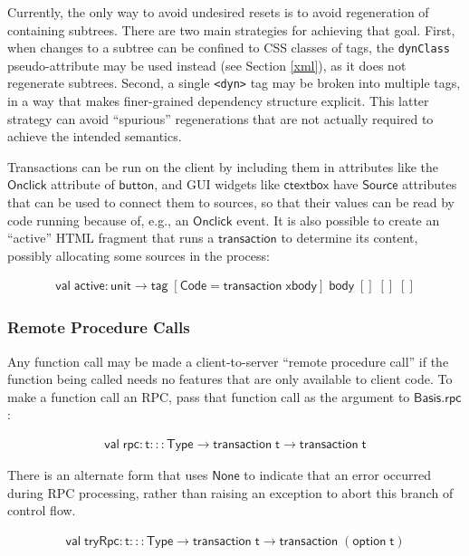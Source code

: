 \documentclass{article}
\newcommand{\cd}[1]{\texttt{#1}}
\newcommand{\mt}[1]{\mathsf{#1}}
\begin{document}
Currently, the only way to avoid undesired resets is to avoid regeneration of containing subtrees.  There are two main strategies for achieving that goal.  First, when changes to a subtree can be confined to CSS classes of tags, the \texttt{dynClass} pseudo-attribute may be used instead (see Section \ref{xml}), as it does not regenerate subtrees.  Second, a single \cd{<dyn>} tag may be broken into multiple tags, in a way that makes finer-grained dependency structure explicit.  This latter strategy can avoid ``spurious'' regenerations that are not actually required to achieve the intended semantics.

Transactions can be run on the client by including them in attributes like the $\mt{Onclick}$ attribute of $\mt{button}$, and GUI widgets like $\mt{ctextbox}$ have $\mt{Source}$ attributes that can be used to connect them to sources, so that their values can be read by code running because of, e.g., an $\mt{Onclick}$ event.  It is also possible to create an ``active'' HTML fragment that runs a $\mt{transaction}$ to determine its content, possibly allocating some sources in the process:

$$\begin{array}{l}
  \mt{val} \; \mt{active} : \mt{unit} \to \mt{tag} \; [\mt{Code} = \mt{transaction} \; \mt{xbody}] \; \mt{body} \; [] \; [] \; []
\end{array}$$

\subsubsection{Remote Procedure Calls}

Any function call may be made a client-to-server ``remote procedure call'' if the function being called needs no features that are only available to client code.  To make a function call an RPC, pass that function call as the argument to $\mt{Basis.rpc}$:

$$\begin{array}{l}
  \mt{val} \; \mt{rpc} : \mt{t} ::: \mt{Type} \to \mt{transaction} \; \mt{t} \to \mt{transaction} \; \mt{t}
\end{array}$$

There is an alternate form that uses $\mt{None}$ to indicate that an error occurred during RPC processing, rather than raising an exception to abort this branch of control flow.

$$\begin{array}{l}
  \mt{val} \; \mt{tryRpc} : \mt{t} ::: \mt{Type} \to \mt{transaction} \; \mt{t} \to \mt{transaction} \; (\mt{option} \; \mt{t})
\end{array}$$
\end{document}
